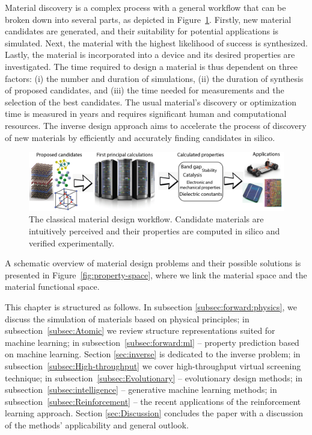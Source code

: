Material discovery is a complex process with a general workflow that can be broken down into several parts, as depicted in Figure~\ref{fig:introduction:design-workflow}. Firstly, new material candidates are generated, and their suitability for potential applications is simulated. Next, the material with the highest likelihood of success is synthesized. Lastly, the material is incorporated into a device and its desired properties are investigated. The time required to design a material is thus dependent on three factors: (i) the number and duration of simulations, (ii) the duration of synthesis of proposed candidates, and (iii) the time needed for measurements and the selection of the best candidates. The usual material's discovery or optimization time is measured in years \cite{maine2016accelerating} and requires significant human and computational resources. The inverse design approach aims to accelerate the process of discovery of new materials by efficiently and accurately finding candidates in silico.
\begin{figure}[htp]
    \noindent
    \centering
    \includegraphics[width=\textwidth]{figures/Discovery_pipe.png}
    \caption{The classical material design workflow. Candidate materials are intuitively perceived and their properties are computed in silico and verified experimentally.}
    \label{fig:introduction:design-workflow}
\end{figure}

A schematic overview of material design problems and their possible solutions is presented in Figure~\ref{fig:property-space}, where we link the material space and the material functional space. 


This chapter is structured as follows. In subsection \ref{subsec:forward:physics}, we discuss the simulation of materials based on physical principles; in subsection~\ref{subsec:Atomic} we review structure representations suited for machine learning; in subsection~\ref{subsec:forward:ml} -- property prediction based on machine learning. Section \ref{sec:inverse} is dedicated to the inverse problem; in subsection~\ref{subsec:High-throughput} we cover high-throughput virtual screening technique; in subsection~\ref{subsec:Evolutionary} -- evolutionary design methods; in subsection~\ref{subsec:intelligence} -- generative machine learning methods; in subsection~\ref{subsec:Reinforcement} -- the recent applications of the reinforcement learning approach. Section \ref{sec:Discussion} concludes the paper with a discussion of the methods' applicability and general outlook. 

